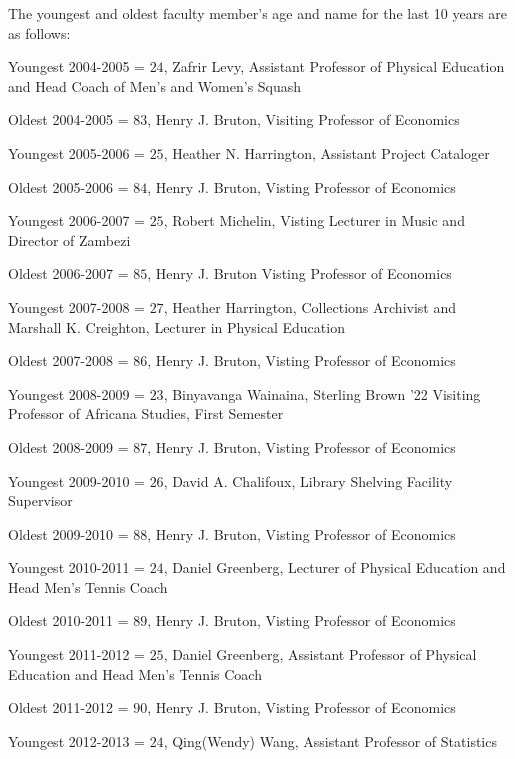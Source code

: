 \documentclass[12pt,a4paper]{article}\usepackage[]{graphicx}\usepackage[]{color}
\theoremstyle{definition}
\begin{document}
\bigskip\noindent
The youngest and oldest faculty member's age and name for the last 10 years are as follows:

\bigskip\noindent
Youngest 2004-2005 = \(24\), Zafrir Levy, Assistant Professor of Physical Education and Head Coach of Men's and Women's Squash

\bigskip\noindent
Oldest 2004-2005 = \(83\), Henry J. Bruton, Visiting Professor of Economics

\bigskip\noindent
Youngest 2005-2006 = \(25\), Heather N. Harrington, Assistant Project Cataloger

\bigskip\noindent
Oldest 2005-2006 = \(84\), Henry J. Bruton, Visting Professor of Economics

\bigskip\noindent
Youngest 2006-2007 = \(25\), Robert Michelin, Visting Lecturer in Music and Director of Zambezi

\bigskip\noindent
Oldest 2006-2007 = \(85\), Henry J. Bruton Visting Professor of Economics

\bigskip\noindent
Youngest 2007-2008 = \(27\), Heather Harrington, Collections Archivist and Marshall K. Creighton, Lecturer in Physical Education

\bigskip\noindent
Oldest 2007-2008 = \(86\), Henry J. Bruton, Visting Professor of Economics

\bigskip\noindent
Youngest 2008-2009 = \(23\), Binyavanga Wainaina, Sterling Brown '22 Visiting Professor of Africana Studies, First Semester

\bigskip\noindent
Oldest 2008-2009 = \(87\), Henry J. Bruton, Visting Professor of Economics

\bigskip\noindent
Youngest 2009-2010 = \(26\), David A. Chalifoux, Library Shelving Facility Supervisor

\bigskip\noindent
Oldest 2009-2010 = \(88\), Henry J. Bruton, Visting Professor of Economics

\bigskip\noindent
Youngest 2010-2011 = \(24\), Daniel Greenberg, Lecturer of Physical Education and Head Men's Tennis Coach

\bigskip\noindent
Oldest 2010-2011 = \(89\), Henry J. Bruton, Visting Professor of Economics

\bigskip\noindent
Youngest 2011-2012 = \(25\), Daniel Greenberg, Assistant Professor of Physical Education and Head Men's Tennis Coach

\bigskip\noindent
Oldest 2011-2012 = \(90\), Henry J. Bruton, Visting Professor of Economics

\bigskip\noindent
Youngest 2012-2013 = \(24\), Qing(Wendy) Wang, Assistant Professor of Statistics
\end{document}
